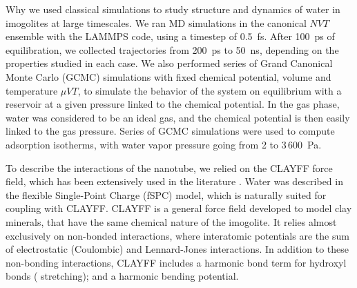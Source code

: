 \documentclass[thesis]{subfiles}
\begin{document}
Why we used classical simulations to study structure and dynamics of water in
imogolites at large timescales. We ran MD simulations in the canonical $NVT$
ensemble with the LAMMPS code\cite{Plimpton1993}, using a timestep of
\SI{0.5}{fs}. After \SI{100}{ps} of equilibration, we collected trajectories
from \SI{200}{ps} to \SI{50}{ns}, depending on the properties studied in each
case. We also performed series of Grand Canonical Monte Carlo (GCMC) simulations
with fixed chemical potential, volume and temperature $\mu VT$, to simulate the
behavior of the system on equilibrium with a reservoir at a given pressure
linked to the chemical potential. In the gas phase, water was considered to be
an ideal gas, and the chemical potential is then easily linked to the gas
pressure\cite{Desbiens2005}. Series of GCMC simulations were used to compute
adsorption isotherms, with water vapor pressure going from 2 to 3\,\SI{600}{Pa}.

To describe the interactions of the nanotube, we relied on the CLAYFF force
field\cite{Cygan2004}, which has been extensively used in the literature
\cite{Konduri2008, Zang2010, Gonzalez2016}. Water was described in the flexible
Single-Point Charge (fSPC) model\cite{Teleman1987}, which is naturally suited
for coupling with CLAYFF. CLAYFF is a general force field developed to model
clay minerals, that have the same chemical nature of the imogolite. It relies
almost exclusively on non-bonded interactions, where interatomic potentials are
the sum of electrostatic (Coulombic) and Lennard-Jones interactions. In addition
to these non-bonding interactions, CLAYFF includes a harmonic bond term for
hydroxyl bonds ( stretching); and a  harmonic bending
potential.
\end{document}
